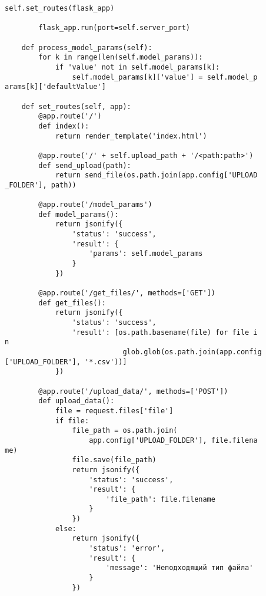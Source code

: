 \begin{lstlisting}[caption={Код backend-части приложения}, label={ls:a:01}]
        self.set_routes(flask_app)

        flask_app.run(port=self.server_port)

    def process_model_params(self):
        for k in range(len(self.model_params)):
            if 'value' not in self.model_params[k]:
                self.model_params[k]['value'] = self.model_p
arams[k]['defaultValue']

    def set_routes(self, app):
        @app.route('/')
        def index():
            return render_template('index.html')

        @app.route('/' + self.upload_path + '/<path:path>')
        def send_upload(path):
            return send_file(os.path.join(app.config['UPLOAD
_FOLDER'], path))

        @app.route('/model_params')
        def model_params():
            return jsonify({
                'status': 'success',
                'result': {
                    'params': self.model_params
                }
            })

        @app.route('/get_files/', methods=['GET'])
        def get_files():
            return jsonify({
                'status': 'success',
                'result': [os.path.basename(file) for file i
n
                            glob.glob(os.path.join(app.config
['UPLOAD_FOLDER'], '*.csv'))]
            })

        @app.route('/upload_data/', methods=['POST'])
        def upload_data():
            file = request.files['file']
            if file:
                file_path = os.path.join(
                    app.config['UPLOAD_FOLDER'], file.filena
me)
                file.save(file_path)
                return jsonify({
                    'status': 'success',
                    'result': {
                        'file_path': file.filename
                    }
                })
            else:
                return jsonify({
                    'status': 'error',
                    'result': {
                        'message': 'Неподходящий тип файла'
                    }
                })


\end{lstlisting}
